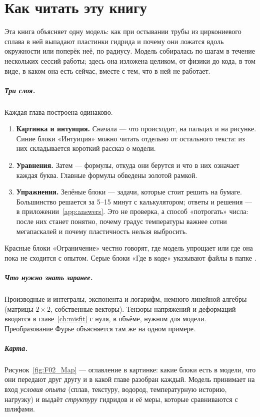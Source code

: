 \chapter*{Как читать эту книгу}

Эта книга объясняет одну модель: как при остывании трубы из циркониевого сплава в ней
выпадают пластинки гидрида и почему они ложатся вдоль окружности или поперёк неё, по радиусу.
Модель собиралась по шагам в течение нескольких сессий работы; здесь она изложена целиком,
от физики до кода, в том виде, в каком она есть сейчас, вместе с тем, что в ней не работает.

\paragraph{Три слоя.} Каждая глава построена одинаково.
\begin{enumerate}
\item \textbf{Картинка и интуиция.} Сначала --- что происходит, на пальцах и на рисунке.
  Синие блоки «Интуиция» можно читать отдельно от остального текста: из них складывается
  короткий рассказ о модели.
\item \textbf{Уравнения.} Затем --- формулы, откуда они берутся и что в них означает каждая буква.
  Главные формулы обведены золотой рамкой.
\item \textbf{Упражнения.} Зелёные блоки --- задачи, которые стоит решить на бумаге. Большинство
  решается за 5--15 минут с калькулятором; ответы и решения --- в приложении~\ref{app:answers}.
  Это не проверка, а способ «потрогать» числа: после них станет понятно, почему градус
  температуры важнее сотни мегапаскалей и почему пластичность нельзя выбросить.
\end{enumerate}
Красные блоки «Ограничение» честно говорят, где модель упрощает или где она пока не сходится
с опытом. Серые блоки «Где в коде» указывают файлы в папке .

\paragraph{Что нужно знать заранее.} Производные и интегралы, экспонента и логарифм, немного
линейной алгебры (матрицы $2\times2$, собственные векторы). Тензоры напряжений и деформаций
вводятся в главе~\ref{ch:misfit} с нуля, в объёме, нужном для модели. Преобразование Фурье
объясняется там же на одном примере.

\paragraph{Карта.} Рисунок~\ref{fig:F02_Map} --- оглавление в картинке: какие блоки есть в модели,
что они передают друг другу и в какой главе разобран каждый. Модель принимает на вход
\emph{условия опыта} (сплав, текстуру, водород, температурную историю, нагрузку) и выдаёт
\emph{структуру} гидридов и её меры, которые сравниваются с шлифами.

